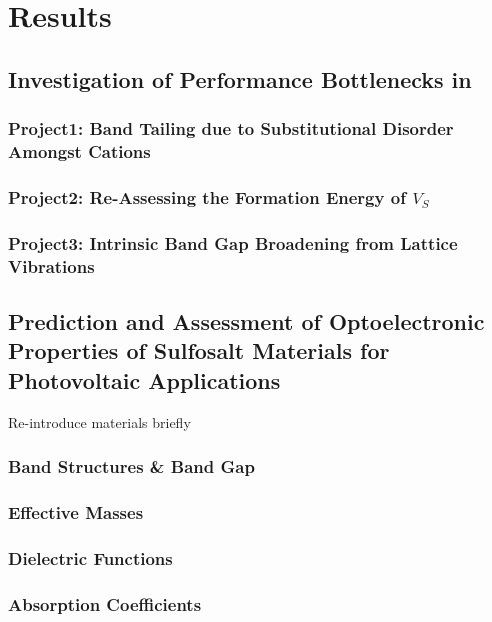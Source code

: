 \chapter{Results}
\section{Investigation of Performance Bottlenecks in \CZTS}
\subsection{Project1: Band Tailing due to Substitutional Disorder Amongst Cations}
\subsection{Project2: Re-Assessing the Formation Energy of $V_S$}
\subsection{Project3: Intrinsic Band Gap Broadening from Lattice Vibrations}
 
\section{Prediction and Assessment of Optoelectronic Properties of Sulfosalt Materials for Photovoltaic Applications}
Re-introduce materials briefly
\subsection{Band Structures \& Band Gap}
\subsection{Effective Masses}
\subsection{Dielectric Functions}
\subsection{Absorption Coefficients}